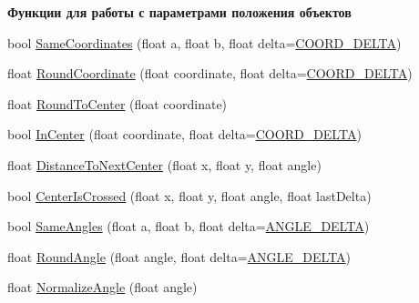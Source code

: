 \begin{Indent}\textbf{ Функции для работы с параметрами положения объектов}\par
\begin{DoxyCompactItemize}
\item 
bool \hyperlink{namespacertm_aa633b82b63b7cff4e9b08bf6a05ec383}{Same\+Coordinates} (float a, float b, float delta=\hyperlink{namespacertm_a9ae158a8873bdf59aa9872cdada6c657}{C\+O\+O\+R\+D\+\_\+\+D\+E\+L\+TA})
\item 
float \hyperlink{namespacertm_a511bf31b8bfc36474baaf915bc11a619}{Round\+Coordinate} (float coordinate, float delta=\hyperlink{namespacertm_a9ae158a8873bdf59aa9872cdada6c657}{C\+O\+O\+R\+D\+\_\+\+D\+E\+L\+TA})
\item 
float \hyperlink{namespacertm_aa2d382c50aa6366b09deaa529d1b3199}{Round\+To\+Center} (float coordinate)
\item 
bool \hyperlink{namespacertm_a030416c27fb4a5896aad3d102083897f}{In\+Center} (float coordinate, float delta=\hyperlink{namespacertm_a9ae158a8873bdf59aa9872cdada6c657}{C\+O\+O\+R\+D\+\_\+\+D\+E\+L\+TA})
\item 
float \hyperlink{namespacertm_aa546266dce0a8d2a50a7fe311e514668}{Distance\+To\+Next\+Center} (float x, float y, float angle)
\item 
bool \hyperlink{namespacertm_a69199b6d204d2ebf33b76e5a7ad52876}{Center\+Is\+Crossed} (float x, float y, float angle, float last\+Delta)
\item 
bool \hyperlink{namespacertm_abf5da499525e88711c6edfb76314f90b}{Same\+Angles} (float a, float b, float delta=\hyperlink{namespacertm_ac78c5105838adb58682cb69a4c66efd7}{A\+N\+G\+L\+E\+\_\+\+D\+E\+L\+TA})
\item 
float \hyperlink{namespacertm_a2c9be06724a54815f6f2f638cf9ae613}{Round\+Angle} (float angle, float delta=\hyperlink{namespacertm_ac78c5105838adb58682cb69a4c66efd7}{A\+N\+G\+L\+E\+\_\+\+D\+E\+L\+TA})
\item 
float \hyperlink{namespacertm_a72a57dbe581a6743525e1920296d42fe}{Normalize\+Angle} (float angle)
\end{DoxyCompactItemize}
\end{Indent}
